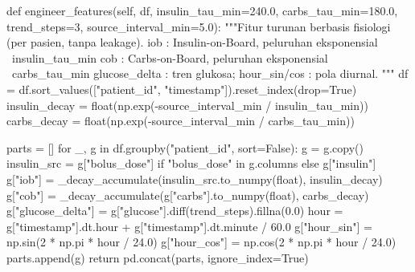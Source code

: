 def engineer_features(self, df, insulin_tau_min=240.0, carbs_tau_min=180.0,
                      trend_steps=3, source_interval_min=5.0):
    """Fitur turunan berbasis fisiologi (per pasien, tanpa leakage).
    iob : Insulin-on-Board, peluruhan eksponensial ~insulin_tau_min
    cob : Carbs-on-Board,   peluruhan eksponensial ~carbs_tau_min
    glucose_delta : tren glukosa; hour_sin/cos : pola diurnal.
    """
    df = df.sort_values(["patient_id", "timestamp"]).reset_index(drop=True)
    insulin_decay = float(np.exp(-source_interval_min / insulin_tau_min))
    carbs_decay   = float(np.exp(-source_interval_min / carbs_tau_min))

    parts = []
    for _, g in df.groupby("patient_id", sort=False):
        g = g.copy()
        insulin_src = g["bolus_dose"] if "bolus_dose" in g.columns else g["insulin"]
        g["iob"] = _decay_accumulate(insulin_src.to_numpy(float), insulin_decay)
        g["cob"] = _decay_accumulate(g["carbs"].to_numpy(float), carbs_decay)
        g["glucose_delta"] = g["glucose"].diff(trend_steps).fillna(0.0)
        hour = g["timestamp"].dt.hour + g["timestamp"].dt.minute / 60.0
        g["hour_sin"] = np.sin(2 * np.pi * hour / 24.0)
        g["hour_cos"] = np.cos(2 * np.pi * hour / 24.0)
        parts.append(g)
    return pd.concat(parts, ignore_index=True)
